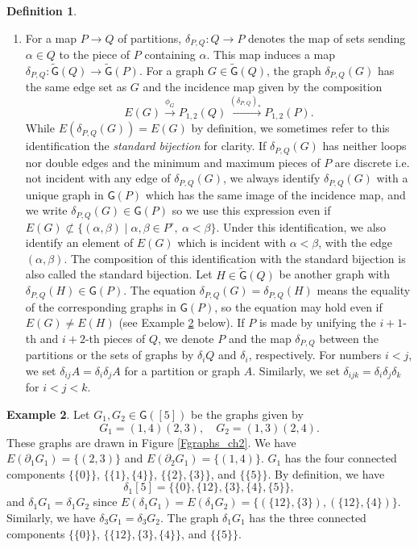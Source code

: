 \documentclass[reqno]{amsart}
\theoremstyle{definition}
\newtheorem{defi}{Definition}[section]
\newtheorem{exa}[defi]{Example}
\theoremstyle{plain}
\newcommand{\GG}{\mathsf{G}}%
\newcommand{\TGG}{\tilde{\mathsf{G}}}%
\begin{document}
\begin{defi}
\begin{enumerate}
\item For a map $P\to Q$ of partitions,  $\delta_{P,Q}:Q\to P$ denotes the map of sets sending  $\alpha\in Q$ to the piece of $P$ containing $\alpha$. This map induces a map $\delta_{P,Q}:\TGG(Q)\to \TGG(P)$. For a graph $G\in \TGG(Q)$, the  graph $\delta_{P,Q}(G)$ has the same edge set as $G$  and the incidence map  given by the composition
\[
E(G)\stackrel{\phi_G}{\to}P_{1,2}(Q)\stackrel{(\delta_{P,Q})_*}{\to}P_{1,2}(P).
\] While $E(\delta_{P,Q}(G))=E(G)$ by definition, we sometimes refer to this identification  the {\em standard bijection} for clarity. If $\delta_{P,Q}(G)$ has neither loops nor double edges and the minimum and maximum pieces of $P$ are discrete i.e. not incident with any edge of $\delta_{P,Q}(G)$, we always identify $\delta_{P,Q}(G)$ with a unique graph in $\GG(P)$ which has the same image of the incidence map, and we write $\delta_{P,Q}(G)\in \GG(P)$ so we use this expression even if $E(G)\not \subset \{(\alpha,\beta)\mid \alpha, \beta \in P^\circ ,\ \alpha<\beta\}$. Under this identification, we also identify an element of $E(G)$ which is  incident with $\alpha<\beta$, with the edge $(\alpha,\beta)$. The composition of this identification with the standard bijection is also called the standard bijection. Let $H\in \TGG(Q)$ be another graph with $\delta_{P,Q}(H)\in \GG(P)$. The equation $\delta_{P,Q}(G)=\delta_{P,Q}(H)$ means the equality of the corresponding graphs in $\GG(P)$, so the equation may hold even if $E(G)\not=E(H)$ (see Example \ref{Egraph} below). If $P$ is made by unifying the $i+1$-th and $i+2$-th pieces of $Q$, we denote $P$ and the map $\delta_{P,Q}$ between the partitions or the sets of graphs  by $\delta_iQ$ and $\delta_i$, respectively. For numbers $i<j$, we set $\delta_{ij}A=\delta_i\delta_jA$ for a partition or graph $A$.  Similarly, we set  $\delta_{ijk}=\delta_i\delta_j\delta_k$ for $i<j<k$.

\end{enumerate}
\end{defi}
\begin{exa}\label{Egraph}
Let $G_1, G_2 \in \GG([5])$ be the graphs   given by
\[
G_1=(1,4)(2,3),\quad G_2=(1,3)(2,4).
\]
These graphs are drawn  in Figure \ref{Fgraphs_ch2}. We have $E(\partial_1G_1)=\{(2,3)\}$ and $E(\partial_2G_1)=\{(1,4)\}$. $G_1$ has the four connected components $\{\{0\}\}$, $\{\{1\},\{4\}\}$, $\{\{2\},\{3\}\}$, and $\{\{5\}\}$. By definition, we have
\[
\delta_1[5]=\{\{0\},\{12\},\{3\},\{4\},\{5\}\}, 
\]
and $\delta_1G_1=\delta_1G_2$ since $E(\delta_1G_1)=E(\delta_1G_2)=\{(\{12\},\{3\}),(\{12\},\{4\})\}$. Similarly, we have $\delta_3G_1=\delta_3G_2$. The graph $\delta_1G_1$ has the three connected components $\{\{0\}\}$, $\{\{12\},\{3\}, \{4\}\}$, and $\{\{5\}\}$. 
\end{exa}
\end{document}
